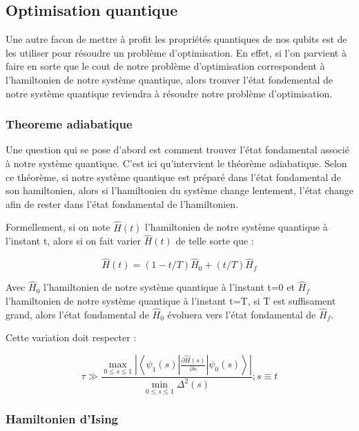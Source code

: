 \documentclass{article}
\begin{document}
\begin{multicols}{2}
\subsection{Optimisation quantique}

Une autre facon de mettre à profit les propriétés quantiques de nos qubits est de les utiliser pour résoudre un problème d'optimisation.
En effet, si l'on parvient à faire en sorte que le cout de notre problème d'optimisation correspondent à l'hamiltonien de notre système quantique, alors trouver l'état fondemental de notre système quantique reviendra à résoudre notre problème d'optimisation.

\subsubsection{Theoreme adiabatique}

Une question qui se pose d'abord est comment trouver l'état fondamental associé à notre système quantique. 
C'est ici qu'intervient le théorème adiabatique. Selon ce théorème, si notre système quantique est préparé dans l'état fondamental de son hamiltonien, alors si l'hamiltonien du système change lentement, l'état change afin de rester dans l'état fondamental de l'hamiltonien.

Formellement, si on note $\hat{H}(t)$ l'hamiltonien de notre système quantique à l'instant t, alors si on fait varier $\hat{H}(t)$ de telle sorte que :

\begin{equation}
    \hat{H}(t) = (1-t/T)\hat{H}_0 + (t/T)\hat{H}_f
\end{equation}

Avec $\hat{H}_0$ l'hamiltonien de notre système quantique à l'instant t=0 et $\hat{H}_f$ l'hamiltonien de notre système quantique à l'instant t=T, si T est suffisament grand, alors l'état fondamental de $\hat{H}_0$ évoluera vers l'état fondamental de $\hat{H}_f$.

Cette variation doit respecter :

\begin{equation}
    \tau \gg \frac{\max_{ 0 \leq s \leq 1}  \left| \left\langle \psi_1(s) \left| \frac{\partial \hat{H}(s)}{\partial s} \right| \psi_0(s) \right\rangle \right| }{\min_{0 \leq s \leq 1} \Delta^2(s)} ; s \equiv t 
\end{equation}

\subsubsection{Hamiltonien d'Ising}


\end{multicols}
\end{document}
